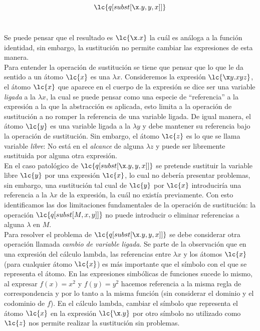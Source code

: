 \[\lc{q[subst[\x.y,y,x]]}\] \

Se puede pensar que el resultado es \(\lc{\x.x}\) la cuál es análoga a la
función identidad, sin embargo, la sustitución no permite cambiar las
expresiones de esta manera. \\

Para entender la operación de sustitución se tiene que pensar que lo que le da
sentido a un átomo \(\lc{x}\) es una \(\lambda x\). Consideremos la expresión
\(\lc{\x y.x y z}\), el átomo \(\lc{x}\) que aparece en el cuerpo de la
expresión se dice ser una variable \emph{ligada} a la \(\lambda x\), la cual se
puede pensar como una especie de ``referencia'' a la expresión a la que la
abstracción es aplicada, esto limita a la operación de sustitución a no romper
la referencia de una variable ligada. De igual manera, el átomo \(\lc{y}\) es
una variable ligada a la \(\lambda y\) y debe mantener su referencia bajo la
operación de sustitución. Sin embargo, el átomo \(\lc{z}\) es lo que se llama
variable \emph{libre}: No está en el \emph{alcance} de alguna
\(\lambda z\) y puede ser libremente sustituida por alguna otra expresión. \\

En el caso patológico de \(\lc{q[subst[\x.y,y,x]]}\) se pretende sustituir la
variable libre \(\lc{y}\) por una expresión \(\lc{x}\), lo cual no debería
presentar problemas, sin embargo, una sustitución tal cual de \(\lc{y}\) por
\(\lc{x}\) introduciría una referencia a la \(\lambda x\) de la expresión, la
cuál no existía previamente. Con esto identificamos las dos limitaciones
fundamentales de la operación de sustitución: la operación
\(\lc{q[subst[M,x,y]]}\) no puede introducir o eliminar referencias a alguna
\(\lambda\) en \(M\). \\

Para resolver el problema de \(\lc{q[subst[\x.y,y,x]]}\) se debe considerar otra
operación llamada \emph{cambio de variable ligada}. Se parte de la observación
que en una expresión del cálculo lambda, las referencias entre \(\lambda x\) y
los átomos \(\lc{x}\) (para cualquier átomo \(\lc{x}\)) es más importante que el
símbolo con el que se representa el átomo. En las expresiones simbólicas de
funciones sucede lo mismo, al expresar \(f(x)=x^{2}\) y \(f(y)=y^{2}\) hacemos
referencia a la misma regla de correspondencia y por lo tanto a la misma función
(sin considerar el dominio y el codominio de \(f\)). En el cálculo lambda,
cambiar el símbolo que representa el átomo \(\lc{x}\) en la expresión
\(\lc{\x.y}\) por otro símbolo no utilizado como \(\lc{z}\) nos permite realizar
la sustitución sin problemas. \\

